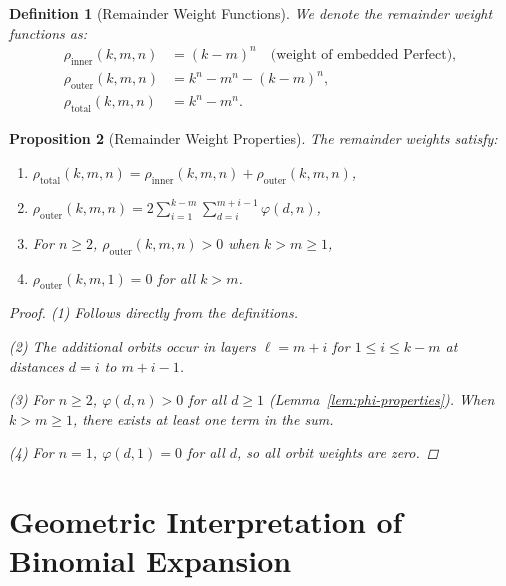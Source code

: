 \documentclass[11pt]{article}
\newtheorem{definition}{Definition}[section]
\newtheorem{proposition}[definition]{Proposition}
\begin{document}
\begin{definition}[Remainder Weight Functions]\label{def:remainder-weights}
We denote the remainder weight functions as:
\begin{align}
\rho_{\text{inner}}(k,m,n) &= (k-m)^n \quad \text{(weight of embedded Perfect)}, \\
\rho_{\text{outer}}(k,m,n) &= k^n - m^n - (k-m)^n, \\
\rho_{\text{total}}(k,m,n) &= k^n - m^n.
\end{align}
\end{definition}

\begin{proposition}[Remainder Weight Properties]\label{prop:remainder-properties}
The remainder weights satisfy:
\begin{enumerate}
    \item $\rho_{\text{total}}(k,m,n) = \rho_{\text{inner}}(k,m,n) + \rho_{\text{outer}}(k,m,n)$,
    \item $\rho_{\text{outer}}(k,m,n) = 2 \sum_{i=1}^{k-m} \sum_{d=i}^{m+i-1} \varphi(d,n)$,
    \item For $n \geq 2$, $\rho_{\text{outer}}(k,m,n) > 0$ when $k > m \geq 1$,
    \item $\rho_{\text{outer}}(k,m,1) = 0$ for all $k > m$.
\end{enumerate}
\begin{proof}
(1) Follows directly from the definitions.

(2) The additional orbits occur in layers $\ell = m+i$ for $1 \leq i \leq k-m$ at distances $d = i$ to $m+i-1$.

(3) For $n \geq 2$, $\varphi(d,n) > 0$ for all $d \geq 1$ (Lemma~\ref{lem:phi-properties}). When $k > m \geq 1$, there exists at least one term in the sum.

(4) For $n=1$, $\varphi(d,1) = 0$ for all $d$, so all orbit weights are zero.
\end{proof}
\end{proposition}



\section{Geometric Interpretation of Binomial Expansion}\label{sec:binomial}
\end{document}
